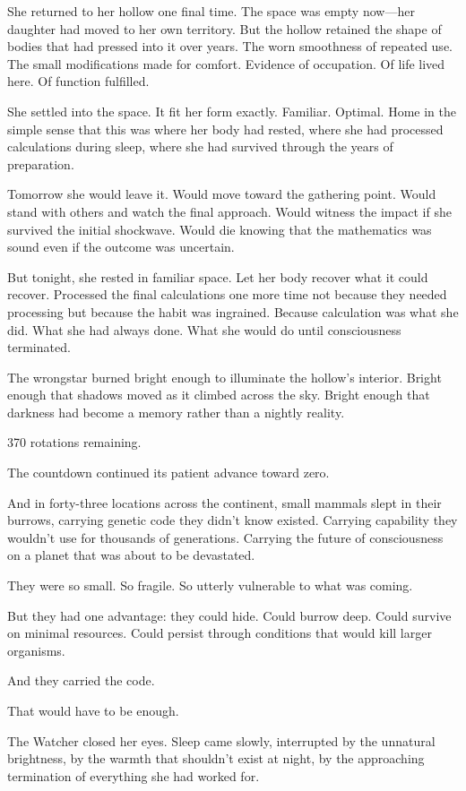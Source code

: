 She returned to her hollow one final time. The space was empty now—her daughter had moved to her own territory. But the hollow retained the shape of bodies that had pressed into it over years. The worn smoothness of repeated use. The small modifications made for comfort. Evidence of occupation. Of life lived here. Of function fulfilled.

She settled into the space. It fit her form exactly. Familiar. Optimal. Home in the simple sense that this was where her body had rested, where she had processed calculations during sleep, where she had survived through the years of preparation.

Tomorrow she would leave it. Would move toward the gathering point. Would stand with others and watch the final approach. Would witness the impact if she survived the initial shockwave. Would die knowing that the mathematics was sound even if the outcome was uncertain.

But tonight, she rested in familiar space. Let her body recover what it could recover. Processed the final calculations one more time not because they needed processing but because the habit was ingrained. Because calculation was what she did. What she had always done. What she would do until consciousness terminated.

The wrongstar burned bright enough to illuminate the hollow's interior. Bright enough that shadows moved as it climbed across the sky. Bright enough that darkness had become a memory rather than a nightly reality.

370 rotations remaining.

The countdown continued its patient advance toward zero.

And in forty-three locations across the continent, small mammals slept in their burrows, carrying genetic code they didn't know existed. Carrying capability they wouldn't use for thousands of generations. Carrying the future of consciousness on a planet that was about to be devastated.

They were so small. So fragile. So utterly vulnerable to what was coming.

But they had one advantage: they could hide. Could burrow deep. Could survive on minimal resources. Could persist through conditions that would kill larger organisms.

And they carried the code.

That would have to be enough.

The Watcher closed her eyes. Sleep came slowly, interrupted by the unnatural brightness, by the warmth that shouldn't exist at night, by the approaching termination of everything she had worked for.

